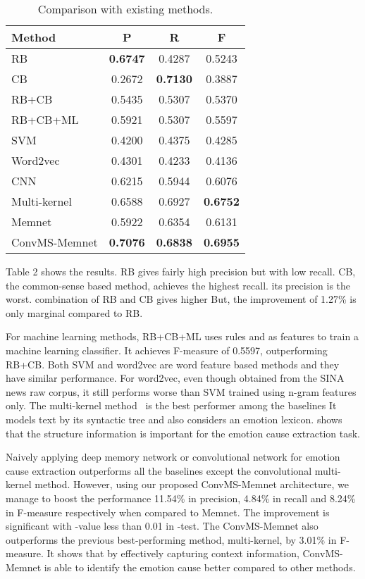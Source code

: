\documentclass[11pt,letterpaper]{article}
\begin{document}
\begin{CJK*}{UTF8}{gbsn}
\begin{table}
\centering
\small
\begin{tabular}{|l|c|c|c|}
\hline
{\bf Method} & {\bf P} & {\bf R} & {\bf F}\\\hline
RB & \bf0.6747&	0.4287&	0.5243\\
CB  & 0.2672	&\bf0.7130	&0.3887\\
RB+CB & 0.5435&	0.5307&	0.5370\\ 
RB+CB+ML & 0.5921	&0.5307&	0.5597\\ 
SVM &0.4200	&0.4375&	0.4285\\
Word2vec & 0.4301&	0.4233&	0.4136\\ 
{CNN}  & 0.6215&	0.5944&	0.6076\\
Multi-kernel  & 0.6588	&0.6927	&\bf0.6752\\ \hline
{Memnet}  & 0.5922&	0.6354&	0.6131\\
{ConvMS-Memnet} & \bf 0.7076 &	\bf0.6838	&\bf0.6955\\ \hline
\end{tabular} 
\caption{Comparison with existing methods.}
\end{table}



Table 2 shows the results.
 RB gives fairly high precision but with low recall. CB, the common-sense based method, achieves the highest recall.
 its precision is the worst.  combination of RB and CB gives higher 
But, the improvement of 1.27\% is only marginal compared to RB. 



For machine learning methods, RB+CB+ML uses  rules and  as features to train a machine learning classifier. It achieves F-measure of 0.5597, outperforming RB+CB. Both SVM and word2vec are word feature based methods and they have similar performance. For word2vec, even though   obtained from the SINA news raw corpus, it still performs worse than SVM trained using n-gram features only. The multi-kernel  method~\cite{gui2016event} is the best performer among the baselines  It models text by its syntactic tree and also considers an emotion lexicon.  shows that the structure information is important for the emotion cause extraction task.

Naively applying  deep memory network or convolutional network for emotion cause extraction outperforms all the baselines except the convolutional multi-kernel method. However, using our proposed ConvMS-Memnet architecture, we manage to boost the performance  11.54\% in precision, 4.84\% in recall and 8.24\% in F-measure respectively when compared to Memnet. 
The improvement is  significant with -value less than 0.01 in -test. The ConvMS-Memnet also outperforms the previous best-performing method, multi-kernel, by 3.01\% in F-measure. It shows that by effectively capturing context information, ConvMS-Memnet is able to identify the emotion cause better compared to other methods. 


\end{CJK*}
\end{document}
